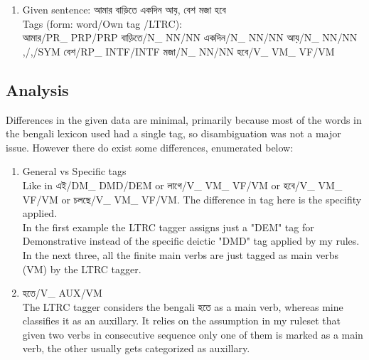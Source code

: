 \documentclass[11pt,a4paper,twocolumn]{article}
\begin{document}
{\begin{enumerate}
		$ $\\
		\item Given sentence: \textcolor{diff}{আমার বাড়িতে একদিন আয়, বেশ মজা হবে}\\
		$ $\\
		Tags (form: word\textcolor{hlit}{/Own tag}
		\textcolor{rlit}{/LTRC}):\\$ $\\
আমার\textcolor{hlit}{/PR\_ PRP}\textcolor{rlit}{/PRP}
বাড়িতে\textcolor{hlit}{/N\_ NN}\textcolor{rlit}{/NN}
একদিন\textcolor{hlit}{/N\_ NN}\textcolor{rlit}{/NN}
আয়\textcolor{hlit}{/N\_ NN}\textcolor{rlit}{/NN}
,\textcolor{hlit}{/,}\textcolor{rlit}{/SYM}
বেশ\textcolor{hlit}{/RP\_ INTF}\textcolor{rlit}{/INTF}
মজা\textcolor{hlit}{/N\_ NN}\textcolor{rlit}{/NN}
হবে\textcolor{hlit}{/V\_ VM\_ VF}\textcolor{rlit}{/VM}\\

	\end{enumerate}			
	}

	\subsection{Analysis}
	Differences in the given data are minimal, primarily
	because most of the words in the bengali lexicon used
	had a single tag, so disambiguation was not a major
	issue. However there do exist some differences, 
	enumerated below:\\
	
	\begin{enumerate}
	\item General vs Specific tags\\
	$ $\\
	Like in {\bg এই\textcolor{hlit}{/DM\_ DMD}\textcolor{rlit}{/DEM}}
	or {\bg লাগে\textcolor{hlit}{/V\_ VM\_ VF}\textcolor{rlit}{/VM}}
	or {\bg হবে\textcolor{hlit}{/V\_ VM\_ VF}\textcolor{rlit}{/VM}}
	or {\bg চলছে\textcolor{hlit}{/V\_ VM\_ VF}\textcolor{rlit}{/VM}}.
	The difference in tag here is the specifity applied.\\
	$ $\\ 
	In the first example the LTRC tagger assigns just a 
	"DEM" tag for Demonstrative instead of the specific
	deictic "DMD" tag applied by my rules.\\
	$ $\\
	In the next three, all the finite main verbs are just
	tagged as main verbs (VM) by the LTRC tagger. 
	
	\item {\bg হতে\textcolor{hlit}{/V\_ AUX}\textcolor{rlit}{/VM}}\\
	$ $\\
	The LTRC tagger considers the bengali {\bg হতে} as a 
	main verb, whereas mine classifies it as an auxillary.
	It relies on the assumption in my ruleset that given
	two verbs in consecutive sequence only one of them is
	marked as a main verb, the other usually gets 
	categorized as auxillary.
	\end{enumerate}			
\end{document}
